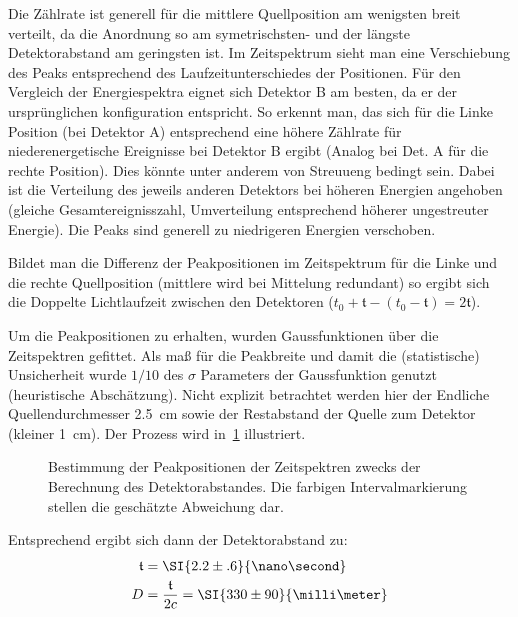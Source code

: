 \documentclass[slug=PET, room=Andreas-Schubert-Bau\,\ 424A, supervisor=Carsten\ Bittrich, coursedate=10.\ 01.\ 2020]{../../Lab_Report_LaTeX/lab_report}
\begin{document}
Die Z\"ahlrate ist generell f\"ur die mittlere Quellposition am
wenigsten breit verteilt, da die Anordnung so am symetrischsten- und
der l\"angste Detektorabstand am geringsten ist. Im Zeitspektrum sieht
man eine Verschiebung des Peaks entsprechend des Laufzeitunterschiedes
der Positionen. F\"ur den Vergleich der Energiespektra eignet sich
Detektor B am besten, da er der urspr\"unglichen konfiguration
entspricht. So erkennt man, das sich f\"ur die Linke Position (bei
Detektor A) entsprechend eine h\"ohere Z\"ahlrate f\"ur
niederenergetische Ereignisse bei Detektor B ergibt (Analog bei Det. A
f\"ur die rechte Position). Dies k\"onnte unter anderem von Streuueng
bedingt sein. Dabei ist die Verteilung des jeweils anderen Detektors
bei h\"oheren Energien angehoben (gleiche Gesamtereignisszahl,
Umverteilung entsprechend h\"oherer ungestreuter Energie).  Die Peaks
sind generell zu niedrigeren Energien verschoben.

Bildet man die Differenz der Peakpositionen im Zeitspektrum f\"ur die Linke und
die rechte Quellposition (mittlere wird bei Mittelung redundant) so
ergibt sich die Doppelte Lichtlaufzeit zwischen den Detektoren (\(t_0
+ \mathfrak{t} - (t_0
- \mathfrak{t}) = 2\mathfrak{t}\)).

Um die Peakpositionen zu erhalten, wurden Gaussfunktionen \"uber die
Zeitspektren gefittet. Als ma\ss{} f\"ur die Peakbreite und damit die
(statistische) Unsicherheit wurde \(1/10\) des \(\sigma\) Parameters
der Gaussfunktion genutzt (heuristische Absch\"atzung). Nicht explizit
betrachtet werden hier der Endliche Quellendurchmesser
\SI{2.5}{\centi\meter} sowie der Restabstand der Quelle zum Detektor
(kleiner \SI{1}{\centi\meter}). Der Prozess wird
in~\ref{fig:calibration-lenght_det} illustriert.

\begin{figure}[H]\centering
  
  \caption[Abstandsbestimmung]{Bestimmung der Peakpositionen der Zeitspektren zwecks der
    Berechnung des Detektorabstandes. Die farbigen Intervalmarkierung
    stellen die gesch\"atzte Abweichung dar.}
  \label{fig:calibration-lenght_det}
\end{figure}

Entsprechend ergibt sich dann der Detektorabstand zu:
\begin{align}
  \label{eq:abst}
  \mathfrak{t} &= \SI{2.2\pm .6}{\nano\second} \\
  D &= \frac{\mathfrak{t}}{2c} = \SI{330\pm 90}{\milli\meter}
\end{align}
\end{document}
